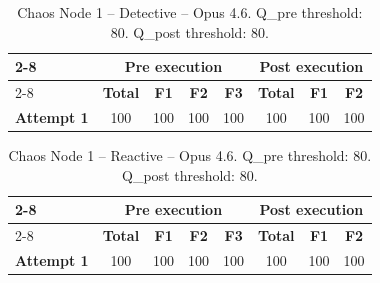 \begin{table}[h]
\centering
\begin{tabular}{l|cccc|ccc|}
\cline{2-8}
& \multicolumn{4}{c|}{\textbf{Pre execution}} & \multicolumn{3}{c|}{\textbf{Post execution}} \\
\cline{2-8}
& \textbf{Total} & \textbf{F1} & \textbf{F2} & \textbf{F3} & \textbf{Total} & \textbf{F1} & \textbf{F2} \\
\hline
\textbf{Attempt 1} & 100 & 100 & 100 & 100 & 100 & 100 & 100 \\
\hline
\end{tabular}
\caption{Chaos Node 1 -- Detective -- Opus 4.6. Q\_pre threshold: 80. Q\_post threshold: 80.}
\label{tab:cn1_detective_opus46}
\end{table}

\clearpage

\begin{table}[h]
\centering
\begin{tabular}{l|cccc|ccc|}
\cline{2-8}
& \multicolumn{4}{c|}{\textbf{Pre execution}} & \multicolumn{3}{c|}{\textbf{Post execution}} \\
\cline{2-8}
& \textbf{Total} & \textbf{F1} & \textbf{F2} & \textbf{F3} & \textbf{Total} & \textbf{F1} & \textbf{F2} \\
\hline
\textbf{Attempt 1} & 100 & 100 & 100 & 100 & 100 & 100 & 100 \\
\hline
\end{tabular}
\caption{Chaos Node 1 -- Reactive -- Opus 4.6. Q\_pre threshold: 80. Q\_post threshold: 80.}
\label{tab:cn1_reactive_opus46}
\end{table}


